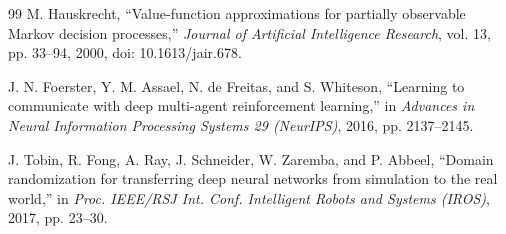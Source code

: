 \begin{thebibliography}{99}
M. Hauskrecht, ``Value-function approximations for partially observable Markov decision
processes,'' \emph{Journal of Artificial Intelligence Research}, vol. 13, pp. 33--94, 2000,
doi: 10.1613/jair.678.

J. N. Foerster, Y. M. Assael, N. de Freitas, and S. Whiteson, ``Learning to communicate with
deep multi-agent reinforcement learning,'' in \emph{Advances in Neural Information Processing
Systems 29 (NeurIPS)}, 2016, pp. 2137--2145.

J. Tobin, R. Fong, A. Ray, J. Schneider, W. Zaremba, and P. Abbeel, ``Domain randomization for
transferring deep neural networks from simulation to the real world,'' in \emph{Proc.
IEEE/RSJ Int. Conf. Intelligent Robots and Systems (IROS)}, 2017, pp. 23--30.

\end{thebibliography}
